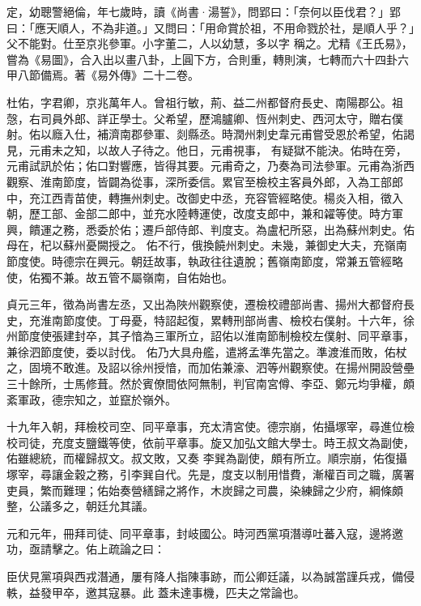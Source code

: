 \begin{pinyinscope}
 定，幼聰警絕倫，年七歲時，讀《尚書·湯誓》，問郢曰：「奈何以臣伐君？」郢曰：「應天順人，不為非道。」又問曰：「用命賞於祖，不用命戮於社，是順人乎？」父不能對。仕至京兆參軍。小字董二，人以幼慧，多以字
 稱之。尤精《王氏易》，嘗為《易圖》，合入出以畫八卦，上圓下方，合則重，轉則演，七轉而六十四卦六甲八節備焉。著《易外傳》二十二卷。



 杜佑，字君卿，京兆萬年人。曾祖行敏，荊、益二州都督府長史、南陽郡公。祖愨，右司員外郎、詳正學士。父希望，歷鴻臚卿、恆州刺史、西河太守，贈右僕射。佑以廕入仕，補濟南郡參軍、剡縣丞。時潤州刺史韋元甫嘗受恩於希望，佑謁見，元甫未之知，以故人子待之。他日，元甫視事，
 有疑獄不能決。佑時在旁，元甫試訊於佑；佑口對響應，皆得其要。元甫奇之，乃奏為司法參軍。元甫為浙西觀察、淮南節度，皆闢為從事，深所委信。累官至檢校主客員外郎，入為工部郎中，充江西青苗使，轉撫州刺史。改御史中丞，充容管經略使。楊炎入相，徵入朝，歷工部、金部二郎中，並充水陸轉運使，改度支郎中，兼和糴等使。時方軍興，饋運之務，悉委於佑；遷戶部侍郎、判度支。為盧杞所惡，出為蘇州刺史。佑母在，杞以蘇州憂闕授之。
 佑不行，俄換饒州刺史。未幾，兼御史大夫，充嶺南節度使。時德宗在興元。朝廷故事，執政往往遺脫；舊嶺南節度，常兼五管經略使，佑獨不兼。故五管不屬嶺南，自佑始也。



 貞元三年，徵為尚書左丞，又出為陜州觀察使，遷檢校禮部尚書、揚州大都督府長史，充淮南節度使。丁母憂，特詔起復，累轉刑部尚書、檢校右僕射。十六年，徐州節度使張建封卒，其子愔為三軍所立，詔佑以淮南節制檢校左僕射、同平章事，兼徐泗節度使，委以討伐。
 佑乃大具舟艦，遣將孟準先當之。準渡淮而敗，佑杖之，固境不敢進。及詔以徐州授愔，而加佑兼濠、泗等州觀察使。在揚州開設營壘三十餘所，士馬修葺。然於賓僚間依阿無制，判官南宮僔、李亞、鄭元均爭權，頗紊軍政，德宗知之，並竄於嶺外。



 十九年入朝，拜檢校司空、同平章事，充太清宮使。德宗崩，佑攝塚宰，尋進位檢校司徒，充度支鹽鐵等使，依前平章事。旋又加弘文館大學士。時王叔文為副使，佑雖總統，而權歸叔文。叔文敗，又奏
 李巽為副使，頗有所立。順宗崩，佑復攝塚宰，尋讓金穀之務，引李巽自代。先是，度支以制用惜費，漸權百司之職，廣署吏員，繁而難理；佑始奏營繕歸之將作，木炭歸之司農，染練歸之少府，綱條頗整，公議多之，朝廷允其議。



 元和元年，冊拜司徒、同平章事，封岐國公。時河西黨項潛導吐蕃入寇，邊將邀功，亟請擊之。佑上疏論之曰：



 臣伏見黨項與西戎潛通，屢有降人指陳事跡，而公卿廷議，以為誠當謹兵戎，備侵軼，益發甲卒，邀其寇暴。此
 蓋未達事機，匹夫之常論也。




\end{pinyinscope}
